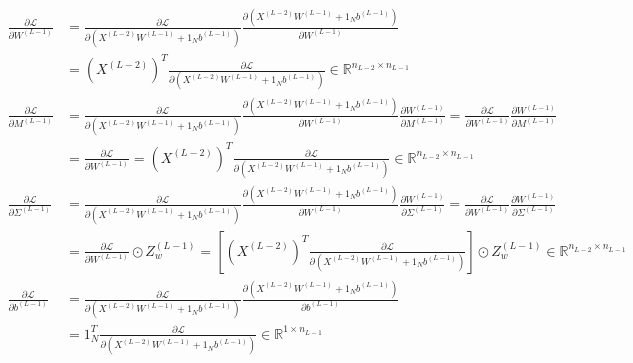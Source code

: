 \documentclass[11pt,a4paper]{article}
\def\mathbf#1{#1}%
\theoremstyle{plain}
\theoremstyle{definition}
\theoremstyle{remark}
\begin{document}
\begin{align}
    \frac{\partial \mathcal{L}}{\partial W^{(L-1)}} &= \frac{\partial \mathcal{L}}{\partial \left( X^{(L-2)} W^{(L-1)} + \mathbf{1}_N \mathbf{b}^{(L-1)} \right)} \frac{\partial \left( X^{(L-2)} W^{(L-1)} + \mathbf{1}_N \mathbf{b}^{(L-1)} \right)}{\partial W^{(L-1)}} \nonumber \\
    &= \left( X^{(L-2)} \right)^T \frac{\partial \mathcal{L}}{\partial \left( X^{(L-2)} W^{(L-1)} + \mathbf{1}_N \mathbf{b}^{(L-1)} \right)} \in \mathbb{R}^{n_{L-2} \times n_{L-1}} \\[0.2em]
    \frac{\partial \mathcal{L}}{\partial M^{(L-1)}} &= \frac{\partial \mathcal{L}}{\partial \left( X^{(L-2)} W^{(L-1)} + \mathbf{1}_N \mathbf{b}^{(L-1)} \right)} \frac{\partial \left( X^{(L-2)} W^{(L-1)} + \mathbf{1}_N \mathbf{b}^{(L-1)} \right)}{\partial W^{(L-1)}} \frac{\partial W^{(L-1)}}{\partial M^{(L-1)}} = \frac{\partial \mathcal{L}}{\partial W^{(L-1)}} \frac{\partial W^{(L-1)}}{\partial M^{(L-1)}} \nonumber \\
    &= \frac{\partial \mathcal{L}}{\partial W^{(L-1)}} = \left( X^{(L-2)} \right)^T \frac{\partial \mathcal{L}}{\partial \left( X^{(L-2)} W^{(L-1)} + \mathbf{1}_N \mathbf{b}^{(L-1)} \right)} \in \mathbb{R}^{n_{L-2} \times n_{L-1}} \\[0.2em]
    \frac{\partial \mathcal{L}}{\partial \Sigma^{(L-1)}} &= \frac{\partial \mathcal{L}}{\partial \left( X^{(L-2)} W^{(L-1)} + \mathbf{1}_N \mathbf{b}^{(L-1)} \right)} \frac{\partial \left( X^{(L-2)} W^{(L-1)} + \mathbf{1}_N \mathbf{b}^{(L-1)} \right)}{\partial W^{(L-1)}} \frac{\partial W^{(L-1)}}{\partial \Sigma^{(L-1)}} = \frac{\partial \mathcal{L}}{\partial W^{(L-1)}} \frac{\partial W^{(L-1)}}{\partial \Sigma^{(L-1)}} \nonumber \\
    &= \frac{\partial \mathcal{L}}{\partial W^{(L-1)}} \odot Z_w^{(L-1)} = \left[ \left( X^{(L-2)} \right)^T \frac{\partial \mathcal{L}}{\partial \left( X^{(L-2)} W^{(L-1)} + \mathbf{1}_N \mathbf{b}^{(L-1)} \right)} \right] \odot Z_w^{(L-1)} \in \mathbb{R}^{n_{L-2} \times n_{L-1}} \\[0.2em]
    \frac{\partial \mathcal{L}}{\partial \mathbf{b}^{(L-1)}} &= \frac{\partial \mathcal{L}}{\partial \left( X^{(L-2)} W^{(L-1)} + \mathbf{1}_N \mathbf{b}^{(L-1)} \right)} \frac{\partial \left( X^{(L-2)} W^{(L-1)} + \mathbf{1}_N \mathbf{b}^{(L-1)} \right)}{\partial \mathbf{b}^{(L-1)}} \nonumber \\
    &= \mathbf{1}_N^T \frac{\partial \mathcal{L}}{\partial \left( X^{(L-2)} W^{(L-1)} + \mathbf{1}_N \mathbf{b}^{(L-1)} \right)} \in \mathbb{R}^{1 \times n_{L-1}}
\end{align}
\end{document}
